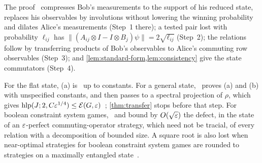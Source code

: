 The proof~\cite[Section~5.1]{DM-game} compresses Bob's measurements to the support of his reduced state, replaces his
observables by involutions without lowering the winning probability and dilates Alice's measurements (Step~1 there); a tested
pair lost with probability $\ell_{ij}$ has $\lVert(A_{ij}\otimes I-I\otimes B_j)\psi\rVert=2\sqrt{\ell_{ij}}$ (Step~2); the
relations follow by transferring products of Bob's observables to Alice's commuting row observables (Step~3); and
\cref{lem:standard-form,lem:consistency} give the state commutators (Step~4).

\begin{remark}\label{rem:transfer}
For the flat state, (a) is~\cite[Proposition~4.4(b)]{SV18} up to constants. For a general state,~\cite[Proposition~5.4]{SV18}
proves (a) and (b) with unspecified constants, and then passes to a spectral projection of $\rho$, which gives
$\operatorname{hlp}(J;2,C\varepsilon^{1/4})\le\mathcal E(G,\varepsilon)$~\cite[Corollary~5.2]{SV18}; \cref{thm:transfer} stops before that step. For boolean
constraint system games,~\cite[Proposition~3.13]{FKMPRSZ25} and \cite[Lemma~2.9]{FKMPRSZ25} bound by $O(\sqrt{\varepsilon})$ the defect,
in the state of an $\varepsilon$-perfect commuting-operator strategy, which need not be tracial, of every relation with a decomposition
of bounded size. A square root is also lost when near-optimal strategies for boolean constraint system games are rounded to
strategies on a maximally entangled state~\cite[Corollary~1.3]{Pad22}.
\end{remark}



